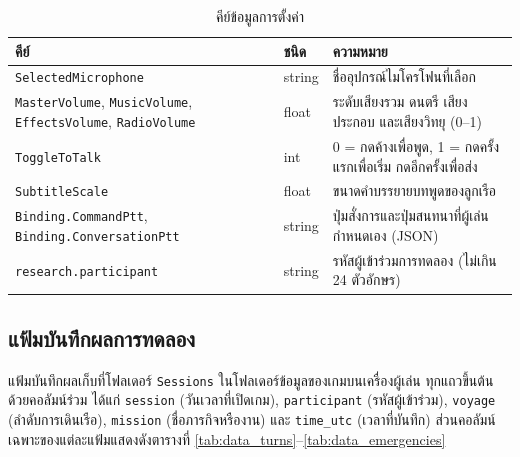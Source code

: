 \begin{table}[!htbp]
\centering
\caption{คีย์ข้อมูลการตั้งค่า}
\label{tab:data_settings}
\begin{tabular}{|L{4.46cm}|L{1.55cm}|L{7.27cm}|}
\hline
\textbf{คีย์} & \textbf{ชนิด} & \textbf{ความหมาย} \\
\hline
\texttt{Selected\allowbreak Microphone} & string & ชื่ออุปกรณ์ไมโครโฟนที่เลือก \\ \hline
\texttt{MasterVolume}, \texttt{MusicVolume}, \texttt{EffectsVolume}, \texttt{RadioVolume} & float & ระดับเสียงรวม ดนตรี เสียงประกอบ และเสียงวิทยุ (0--1) \\ \hline
\texttt{ToggleToTalk} & int & 0 = กดค้างเพื่อพูด, 1 = กดครั้งแรกเพื่อเริ่ม กดอีกครั้งเพื่อส่ง \\ \hline
\texttt{SubtitleScale} & float & ขนาดคำบรรยายบทพูดของลูกเรือ \\ \hline
\texttt{Binding.\allowbreak CommandPtt}, \texttt{Binding.\allowbreak ConversationPtt} & string & ปุ่มสั่งการและปุ่มสนทนาที่ผู้เล่นกำหนดเอง (JSON) \\ \hline
\texttt{research.\allowbreak participant} & string & รหัสผู้เข้าร่วมการทดลอง (ไม่เกิน 24 ตัวอักษร) \\
\hline
\end{tabular}
\end{table}

\subsection{แฟ้มบันทึกผลการทดลอง}

แฟ้มบันทึกผลเก็บที่โฟลเดอร์ \texttt{Sessions} ในโฟลเดอร์ข้อมูลของเกมบนเครื่องผู้เล่น ทุกแถวขึ้นต้นด้วยคอลัมน์ร่วม ได้แก่ \texttt{session} (วันเวลาที่เปิดเกม), \texttt{participant} (รหัสผู้เข้าร่วม), \texttt{voyage} (ลำดับการเดินเรือ), \texttt{mission} (ชื่อภารกิจหรืองาน) และ \texttt{time\_utc} (เวลาที่บันทึก) ส่วนคอลัมน์เฉพาะของแต่ละแฟ้มแสดงดังตารางที่ \ref{tab:data_turns}--\ref{tab:data_emergencies}


